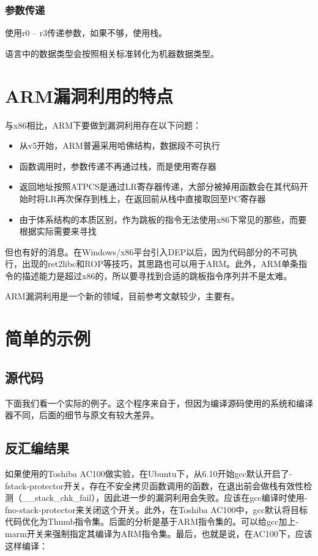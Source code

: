 \subsubsection{参数传递}

使用r0 – r3传递参数，如果不够，使用栈。

语言中的数据类型会按照相关标准转化为机器数据类型。
\section{ARM漏洞利用的特点}
与x86相比，ARM下要做到漏洞利用存在以下问题：
\begin{itemize}
\item 从v5开始，ARM普遍采用哈佛结构，数据段不可执行
\item 函数调用时，参数传递不再通过栈，而是使用寄存器
\item 返回地址按照ATPCS是通过LR寄存器传递，大部分被掉用函数会在其代码开始时将LR再次保存到栈上，在返回前从栈中直接取回至PC寄存器
\item 由于体系结构的本质区别，作为跳板的指令无法使用x86下常见的那些，而要根据实际需要来寻找
\end{itemize}
但也有好的消息。在Windows/x86平台引入DEP以后，因为代码部分的不可执行，出现的ret2libc和ROP等技巧，其思路也可以用于ARM。此外，ARM单条指令的描述能力是超过x86的，所以要寻找到合适的跳板指令序列并不是太难。

ARM漏洞利用是一个新的领域，目前参考文献较少，主要有\cite{arm_exploiting_linux, arm_stack_exploitation, arm_exploitation, arm_ropmap, arm_alphanumeric}。
\section{简单的示例}
\subsection{源代码}
下面我们看一个实际的例子。这个程序来自于\cite{arm_exploiting_linux}，但因为编译源码使用的系统和编译器不同，后面的细节与原文有较大差异。


\subsection{反汇编结果}
如果使用的Toshiba AC100做实验，在Ubuntu下，从6.10开始gcc默认开启了-fstack-protector开关，存在不安全拷贝函数调用的函数，在退出前会做栈有效性检测（\_\_stack\_chk\_fail），因此进一步的漏洞利用会失败。应该在gcc编译时使用-fno-stack-protector来关闭这个开关。此外，在Toshiba AC100中，gcc默认将目标代码优化为Thumb指令集。后面的分析是基于ARM指令集的。可以给gcc加上-marm开关来强制指定其编译为ARM指令集。最后，也就是说，在AC100下，应该这样编译：

